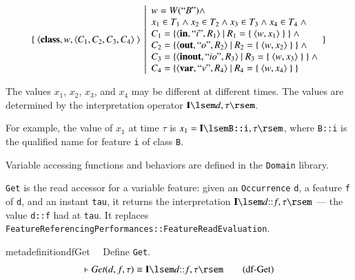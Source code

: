 \[
\{~\langle\textbf{class},w,\langle C_1, C_2, C_3, C_4\rangle~\rangle~\left|
  \begin{array}{l}
  w=W(``B") \wedge \\
  x_1 \in T_1 \wedge x_2 \in T_2 \wedge x_3 \in T_3 \wedge x_4 \in T_4~ \wedge \\
  C_1 = \{ \langle \textbf{in}, ``i", R_1\rangle ~\vert ~R_1 = \{~\langle w, x_1\rangle~ \} ~\} ~\wedge \\
  C_2 = \{ \langle \textbf{out}, ``o", R_2\rangle ~\vert ~R_2 = \{~\langle w, x_2\rangle~ \} ~\} ~\wedge \\
  C_3 = \{ \langle \textbf{inout}, ``io", R_3\rangle ~\vert ~R_3 = \{~\langle w, x_3\rangle~ \} ~\} ~\wedge \\
  C_4 = \{ \langle \textbf{var}, ``v", R_4\rangle ~\vert ~R_4 = \{~\langle w, x_4\rangle~ \} ~\} ~ 
  \end{array} \}
  \right.
\]

\pn The values $x_1$, $x_2$, $x_3$,  and $x_4$ may be different at different times.  The values are determined by the interpretation operator $\mathbf{I}\lsem d,\tau\rsem$.

\pn For example, the value of $x_1$ at time $\tau$ is  $x_1 = \mathbf{I}\lsem \texttt{B::i},\tau\rsem$, where \texttt{B::i} is the qualified name for feature \texttt{i} of class \texttt{B}.

\pn Variable accessing functions and behaviors are defined in the \texttt{Domain} library.

\pn \texttt{Get} is the read accessor for a variable feature: given an \texttt{Occurrence} \texttt{d}, a
feature \texttt{f} of \texttt{d}, and an instant \texttt{tau}, it returns the interpretation
$\mathbf{I}\lsem d{::}f,\tau\rsem$ --- the value \texttt{d::f} had at \texttt{tau}. It replaces
\texttt{FeatureReferencingPer\-form\-ances::FeatureReadEvaluation}.

\begin{restatable}{metadefinition}{dfGet}~~ Define \texttt{Get}.
\begin{align}
\vdash \textit{Get}(d,f,\tau) \equiv \mathbf{I}\lsem d{::}f,\tau\rsem
\label{eq:df-Get}\tag{df-Get}
\end{align}
\end{restatable}

